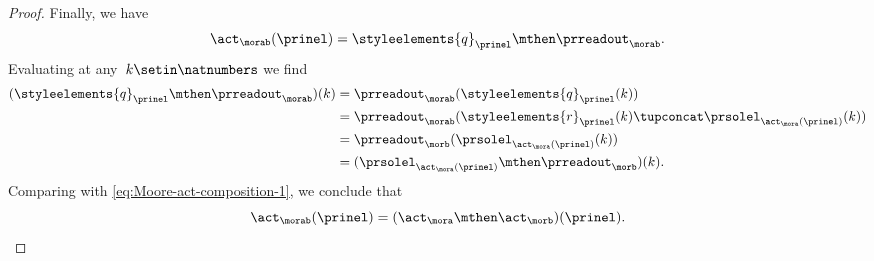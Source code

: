 {\begin{proof}
    Finally, we have
    \begin{equation}
        \act_{\morab}(\prinel) = \styleelements{q}_\prinel \mthen \prreadout_{\morab}.
    \end{equation}
    Evaluating at any~$k \setin \natnumbers$ we find
    \begin{align}
        (\styleelements{q}_\prinel \mthen \prreadout_{\morab})(k)
         & = \prreadout_{\morab}(\styleelements{q}_\prinel(k)) \\
         & = \prreadout_{\morab}(\styleelements{r}_\prinel(k) \tupconcat \prsolel_{\act_\mora(\prinel)}(k)) \\
         & = \prreadout_{\morb}(\prsolel_{\act_\mora(\prinel)}(k)) \\
         & = (\prsolel_{\act_\mora(\prinel)} \mthen \prreadout_{\morb})(k).
    \end{align}
    Comparing with \cref{eq:Moore-act-composition-1}, we conclude that
    \begin{equation}
        \act_{\morab}(\prinel) = (\act_\mora \mthen \act_\morb)(\prinel).
    \end{equation}
\end{proof}


}

